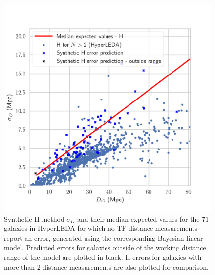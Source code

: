 \documentclass[a4paper,fleqn,usenatbib]{mnras}
\begin{document}
\begin{figure}
	\includegraphics[scale=0.7]{predhl1.png}
    \caption{Synthetic H-method $\sigma_D$ and their median expected values for the 71 galaxies in HyperLEDA for which no TF distance measurements report an error, generated using the corresponding Bayesian linear model. Predicted errors for galaxies outside of the working distance range of the model are plotted in black. H errors for galaxies with more than 2 distance measurements are also plotted for comparison.}
    \label{fig:predhl1}
\end{figure}
\end{document}
